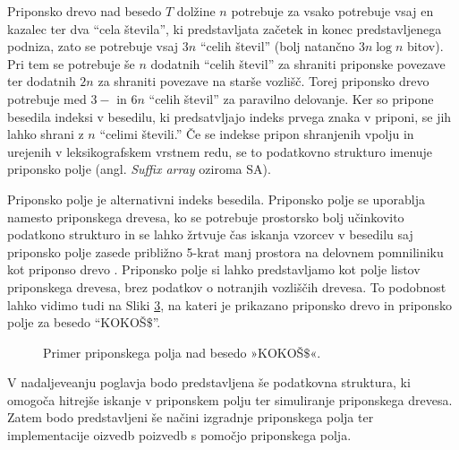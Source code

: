 Priponsko drevo nad besedo $T$ dolžine $n$ potrebuje za vsako potrebuje vsaj en kazalec ter dva \enquote{cela števila}, ki predstavljata začetek in konec predstavljenega podniza, zato se potrebuje vsaj $3n$ \enquote{celih števil} (bolj natančno $3n\log{n}$ bitov). Pri tem se potrebuje še $n$ dodatnih \enquote{celih števil} za shraniti priponske povezave ter dodatnih $2n$ za shraniti povezave na starše vozlišč. Torej priponsko drevo potrebuje med $3-$  in $6n$ \enquote{celih števil} za paravilno delovanje. Ker so pripone besedila indeksi v besedilu, ki predsatvljajo indeks prvega znaka v priponi, se jih lahko shrani z $n$ \enquote{celimi števili.} Če se indekse pripon shranjenih vpolju in urejenih v leksikografskem vrstnem redu, se to podatkovno strukturo imenuje priponsko polje (angl. \textit{Suffix array} oziroma SA).


Priponsko polje je alternativni indeks besedila. Priponsko polje se uporablja namesto priponskega drevesa, ko se potrebuje prostorsko bolj učinkovito podatkono strukturo in se lahko žrtvuje čas iskanja vzorcev v besedilu saj priponsko polje zasede približno 5-krat manj prostora na delovnem pomniliniku kot priponso drevo \cite{Manber1990}. Priponsko polje si lahko predstavljamo kot polje listov priponskega drevesa, brez podatkov o notranjih vozliščih drevesa. To podobnost lahko vidimo tudi na Sliki \ref{fig:SuffuxArray}, na kateri je prikazano priponsko drevo in priponsko polje za besedo \enquote{KOKOŠ$\$$}.

\begin{figure}[htb]
    \begin{subfigure}[t]{\linewidth}
        
        
        \centering
        \subcaption*{}
        \label{fig:aSADrevo}
    \end{subfigure}
    \begin{subfigure}[t]{1\linewidth}        
        
        \centering
        \subcaption*{}
        \label{fig:aSAPolje}
    \end{subfigure}
    \caption{Primer priponskega polja nad besedo »KOKOŠ$\$$«.} 
    \label{fig:SuffuxArray}
\end{figure}

V nadaljeveanju poglavja bodo predstavljena še podatkovna struktura, ki omogoča hitrejše iskanje v priponskem polju ter simuliranje priponskega drevesa. Zatem bodo predstavljeni še načini izgradnje priponskega polja ter implementacije oizvedb poizvedb s pomočjo priponskega polja.

